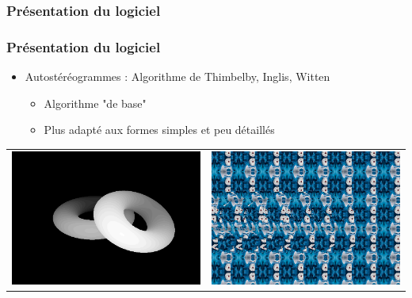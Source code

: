 \documentclass{beamer}
\begin{document}
%
\begin{frame}
\frametitle{Présentation du logiciel}

\centering
{}

\end{frame}




\begin{frame}
\frametitle{Présentation du logiciel}
\begin{itemize}[label=$\bullet$]
\item Autostéréogrammes : Algorithme de Thimbelby, Inglis, Witten \cite{stereogram}
	\begin{itemize}[label=$\circ$]
	\item Algorithme "de base"
	\item Plus adapté aux formes simples et peu détaillés
	\end{itemize}
\end{itemize}
\begin{tabular}{l|r}
\centering
\includegraphics[scale=0.22]{donutdepth.png}
&
\centering
\includegraphics[scale=0.22]{donut1.png}
\end{tabular}


\end{frame}
\end{document}
